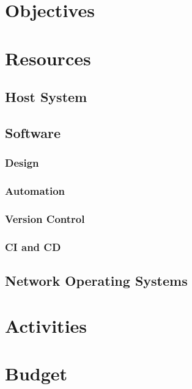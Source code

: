 \documentclass[12pt, letterpaper]{article}
\begin{document}
\newpage

\section{Objectives}

\newpage

\section{Resources}
	
	\subsection{Host System}
	
	\subsection{Software}

		\subsubsection{Design}
		
		\subsubsection{Automation}
		
		\subsubsection{Version Control}
		
		\subsubsection{CI and CD}
		
	\subsection{Network Operating Systems}

\newpage

\section{Activities}

\newpage

\section{Budget}
\end{document}
